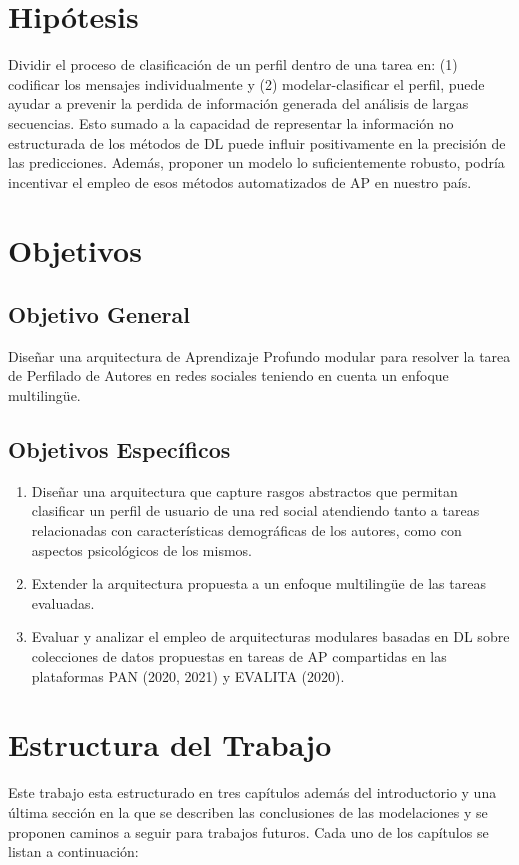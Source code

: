 \section*{Hipótesis}
Dividir el proceso de clasificación de un perfil dentro de una tarea en: (1) codificar los mensajes individualmente y (2) modelar-clasificar el perfil, puede ayudar a prevenir la perdida de información generada del análisis de largas secuencias. Esto sumado a la capacidad de representar la información no estructurada de los métodos de DL puede influir positivamente en la precisión de las predicciones.  Además, proponer un modelo lo suficientemente robusto, podría incentivar el empleo de esos métodos automatizados  de AP en nuestro país.

\section*{Objetivos}
\subsection*{Objetivo General}
Diseñar una arquitectura de Aprendizaje Profundo modular para resolver la tarea de Perfilado de Autores en redes sociales teniendo en cuenta un enfoque multilingüe.
\subsection*{Objetivos Específicos}
\begin{enumerate}
	\item Diseñar una arquitectura que capture rasgos abstractos que permitan clasificar un perfil de usuario de una red social atendiendo tanto a tareas relacionadas con características demográficas de los autores, como con aspectos psicológicos de los mismos.
	\item Extender la arquitectura propuesta a un enfoque multilingüe de las tareas evaluadas.
	\item Evaluar y analizar el empleo de arquitecturas modulares basadas en DL sobre colecciones de datos propuestas en tareas de AP compartidas en las plataformas PAN (2020, 2021) y EVALITA (2020).
\end{enumerate}
\section*{Estructura del Trabajo}
Este trabajo esta estructurado en tres capítulos además del introductorio y una última sección en la que se describen las conclusiones de las modelaciones y se proponen  caminos a seguir para trabajos futuros. Cada uno de los capítulos se listan a continuación: 

